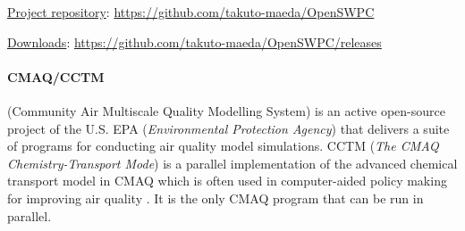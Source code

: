 \underline{Project repository}: \url{https://github.com/takuto-maeda/OpenSWPC}

\underline{Downloads}: \url{https://github.com/takuto-maeda/OpenSWPC/releases}
\iffalse
\underline{Use case description}

The first step was to install the required system packages such as \textit{gmt, gmt-dcw, gmt-gshhg, libnetcdf-dev}. The next one required to run \textit{gen\_JIVSM.sh} script to generate files used as a model input around Japanese Islands for seismic wave propagation in and around Japan. They describe 3D complicated subsurface structures of the earth. The above script used the following input files \textit{lp2012nankai-e\_str.zip, lp2012nankai-w\_str.zip} available from public repository at \cite{HERP} and \textit{ETOPO1\_Bed\_g\_gmt4.grd.gz} from \cite{NOAA} to be installed in the \textit{dataset/vmodel} folder.
Finally, inside the \textit{OpenSWPC/src} folder the files \textit{shared/makefile.arch} and \textit{shared/makefile-tools.arch} needed to be updated to fix the system paths.
After successful compilation an input file (e.g example/input.inf) had to be provided to run the application. Critical attributes influencing the run times included the grid size defined by \textit{nx = 1000, ny = 875, nz = 200}   (total grid number in x, y and z directions) and \textit{nt = 100}  (time step number)

Depending on the hardware and installed libraries the following MPI versions were used: Intel\textregistered MPI Library for Linux\textregistered OS, Version 2017 2017.1.132 (2-node Intel\textregistered\ Xeon\textregistered\ Gold 6140, Eagle cluster), Open MPI 1.10.2 (ARM, AMD Epyc\textsuperscript{TM})
\fi



\paragraph{CMAQ/CCTM}
(Community Air Multiscale Quality Modelling System) is an active open-source project of the U.S. EPA (\textit{Environmental Protection Agency}) %
that delivers a suite of programs for conducting air quality model simulations. %
CCTM (\textit{The CMAQ Chemistry-Transport Mode}) is a parallel implementation of the advanced chemical transport model in CMAQ
which is often used in computer-aided policy making for improving air quality \cite{CHEMEL2014410}.
It is the only CMAQ program that can be run in parallel.

